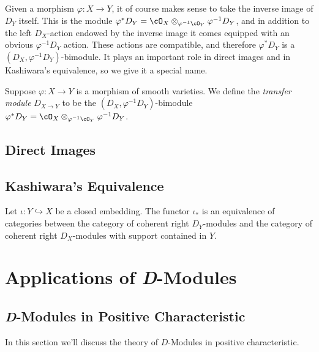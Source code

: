 Given a morphism $\varphi:X\to Y$, it of course makes sense to take the inverse image of $D_Y$ itself. This is the module $\varphi^*D_Y = \cO_X\otimes_{\varphi^{-1}\cO_Y}\varphi^{-1}D_Y$, and in addition to the left $D_X$-action endowed by the inverse image it comes equipped with an obvious $\varphi^{-1}D_Y$ action. These actions are compatible, and therefore $\varphi^*D_Y$ is a $(D_X,\varphi^{-1}D_Y)$-bimodule. It plays an important role in direct images and in Kashiwara's equivalence, so we give it a special name.
\begin{defn}\label{defn:transfer-module}
	Suppose $\varphi:X\to Y$ is a morphism of smooth varieties. We define the \emph{transfer module} $D_{X\to Y}$ to be the $(D_X,\varphi^{-1}D_Y)$-bimodule $\varphi^*D_Y = \cO_X\otimes_{\varphi^{-1}\cO_Y}\varphi^{-1}D_Y$.
\end{defn}



\subsection{Direct Images}

\subsection{Kashiwara's Equivalence}
\begin{thm}\label{thm:kashiwara}
	Let $\iota:Y\hookrightarrow X$ be a closed embedding. The functor $\iota_*$ is an equivalence of categories between the category of coherent right $D_Y$-modules and the category of coherent right $D_X$-modules with support contained in $Y$.
\end{thm}

\section{Applications of \textit{D}-Modules}


\subsection{\emph{D}-Modules in Positive Characteristic}
In this section we'll discuss the theory of $D$-Modules in positive characteristic. 
